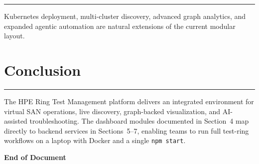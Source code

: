 \documentclass[11pt,a4paper]{article}
\begin{document}
\vspace{0.3cm}\hrule\vspace{0.6cm}

Kubernetes deployment, multi-cluster discovery, advanced graph analytics, and expanded agentic automation are natural extensions of the current modular layout.

\section{Conclusion}

\vspace{0.3cm}\hrule\vspace{0.6cm}

The HPE Ring Test Management platform delivers an integrated environment for virtual SAN operations, live discovery, graph-backed visualization, and AI-assisted troubleshooting. The dashboard modules documented in Section~4 map directly to backend services in Sections~5--7, enabling teams to run full test-ring workflows on a laptop with Docker and a single \texttt{npm start}.

\vspace{1cm}
\begin{center}
\Large\bfseries End of Document
\end{center}
\end{document}
